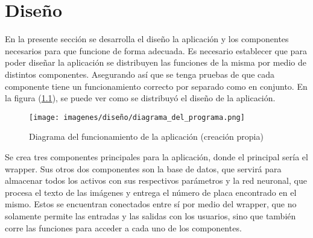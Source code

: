   \chapter{Diseño}
\label{C:desarrollo}

En la presente sección se desarrolla el diseño la aplicación y los componentes necesarios para que funcione de forma adecuada. Es necesario establecer que para poder diseñar la aplicación se distribuyen las funciones de la misma por medio de distintos componentes. Asegurando así que se tenga pruebas de que cada componente tiene un funcionamiento correcto por separado como en conjunto. En la figura (\ref{appdiagram}), se puede ver como se distribuyó el diseño de la aplicación.
\begin{figure}[h!]
    \centering
    \texttt{[image: imagenes/diseño/diagrama\_del\_programa.png]}
    \caption{Diagrama del funcionamiento de la aplicación (creación propia)}
    \label{appdiagram}
\end{figure}
\par
Se crea tres componentes principales para la aplicación, donde el principal sería el wrapper. Sus otros dos componentes son la base de datos, que servirá para almacenar todos los activos con sus respectivos parámetros y la red neuronal, que procesa el texto de las imágenes y entrega el número de placa encontrado en el mismo. Estos se encuentran conectados entre sí por medio del wrapper, que no solamente permite las entradas y las salidas con los usuarios, sino que también corre las funciones para acceder a cada uno de los componentes.

